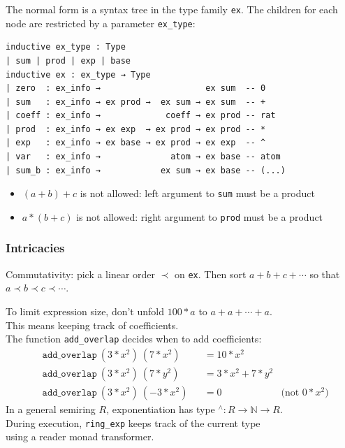 \documentclass{beamer}
\newcommand{\N}{\mathbb{N}}
\newcommand{\lean}[1]{\texttt{#1}\xspace} %
\newcommand{\pow}{{\ensuremath{{}^\wedge}}\xspace}
\newcommand{\ringexp}{\lean{ring\_exp}}
\begin{document}
\begin{frame}[fragile]
	The normal form is a syntax tree in the type family \lean{ex}.
	The children for each node are restricted by a parameter \lean{ex\_type}:

\begin{lstlisting}
inductive ex_type : Type
| sum | prod | exp | base
inductive ex : ex_type → Type
| zero  : ex_info →                     ex sum  -- 0
| sum   : ex_info → ex prod →  ex sum → ex sum  -- +
| coeff : ex_info →             coeff → ex prod -- rat
| prod  : ex_info → ex exp  → ex prod → ex prod -- *
| exp   : ex_info → ex base → ex prod → ex exp  -- ^
| var   : ex_info →              atom → ex base -- atom
| sum_b : ex_info →            ex sum → ex base -- (...)
\end{lstlisting}

	\begin{itemize}
		\item $(a + b) + c$ is not allowed: left argument to \lean{sum} must be a product
		\item $a * (b + c)$ is not allowed: right argument to \lean{prod} must be a product
	\end{itemize}
\end{frame}

\begin{frame} \frametitle{Intricacies}
Commutativity: pick a linear order $\prec$ on \lean{ex}.
Then sort $a + b + c + \cdots$ so that $a \prec b \prec c \prec \cdots$.

\pause
To limit expression size, don't unfold $100 * a$ to $a + a + \cdots + a$.\\
This means keeping track of coefficients.\\
The function \lean{add\_overlap} decides when to add coefficients:
\begin{align*}
	&\lean{add\_overlap}\ (3 * x^2)\ (7 * x^2) &&= 10 * x^2 \\
	&\lean{add\_overlap}\ (3 * x^2)\ (7 * y^2) &&= 3 * x^2 + 7 * y^2 \\
	&\lean{add\_overlap}\ (3 * x^2)\ (-3 * x^2) &&= 0 &\text{(not $0 * x^2$)}
\end{align*}
\pause
In a general semiring $R$, exponentiation has type $\pow : R \to \N \to R$.\\
During execution, \ringexp keeps track of the current type\\
using a reader monad transformer.
\end{frame}
\end{document}
